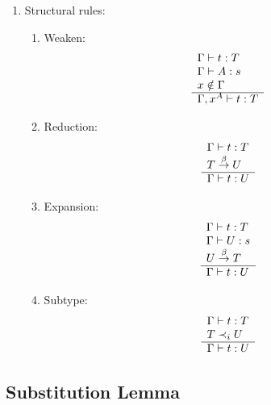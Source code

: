\begin{definition}
\begin{enumerate}
\item Structural rules:
    \begin{enumerate}
    \item Weaken:
        $$
        \begin{array}{l} 
            \Gamma \vdash t: T
            \\
            \Gamma \vdash A: s
            \\
            x \notin \Gamma
         \\ \hline 
            \Gamma, x^A \vdash t: T
        \end{array}
        $$

    \item Reduction:
        $$
        \begin{array}{l} 
            \Gamma \vdash t: T
            \\
            T \stackrel{\beta}{\to} U
         \\ \hline 
            \Gamma \vdash t: U
        \end{array}
        $$

    \item Expansion:
        $$
        \begin{array}{l} 
            \Gamma \vdash t: T
            \\
            \Gamma \vdash U: s
            \\
            U \stackrel{\beta}{\to} T
         \\ \hline 
            \Gamma \vdash t: U
        \end{array}
        $$

    \item Subtype:
        $$
        \begin{array}{l} 
            \Gamma \vdash t: T
            \\
            T \prec_i U
         \\ \hline 
            \Gamma \vdash t: U
        \end{array}
        $$
    \end{enumerate}

\end{enumerate}
\end{definition}


\subsection{Substitution Lemma}



